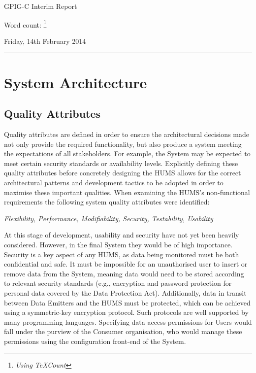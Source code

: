 \documentclass[10pt,a4paper]{article}
\begin{document}
\begin{center}
{\Large GPIG-C Interim Report}

Word count: \unskip
\footnote{\textit{Using TeXCount}}

Friday, 14th February 2014
\end{center}

\vspace{0.3cm}
\rule{\textwidth}{0.4pt}




\section{System Architecture}
\label{sec:architecture}

\subsection{Quality Attributes}
\label{sec:architecture-quality}

Quality attributes are defined in order to ensure the architectural decisions 
made not only provide the required functionality, but also produce a system
meeting the expectations of all 
stakeholders. For example, the System may be expected to meet certain 
security standards or availability levels. Explicitly defining these quality 
attributes before concretely designing the HUMS allows for the correct 
architectural patterns and development tactics to be adopted in order to maximise these important qualities.
When examining the HUMS's non-functional requirements the 
following system quality attributes were identified:
	\begin{center}
	\textit{Flexibility, Performance, Modifiability, Security, 
Testability, Usability}
	\end{center}
At this stage of development, usability and security 
have not yet been heavily considered. However, in the final System they 
would be of high importance. Security is a key aspect of any HUMS, 
as data being monitored must be both confidential and safe. It must be impossible 
for an unauthorised user to insert or remove data from the System, meaning data
would need to be stored according to relevant security standards 
(e.g., encryption and password protection for personal data covered by the 
Data Protection Act). Additionally, data in transit between Data Emitters and the
HUMS must be protected, which can be achieved using a symmetric-key 
encryption protocol. Such protocols are well supported by many programming
languages. Specifying data access permissions for Users would fall under the 
purview of the Consumer organisation, who would manage these permissions using the 
configuration front-end of the System.
\end{document}
